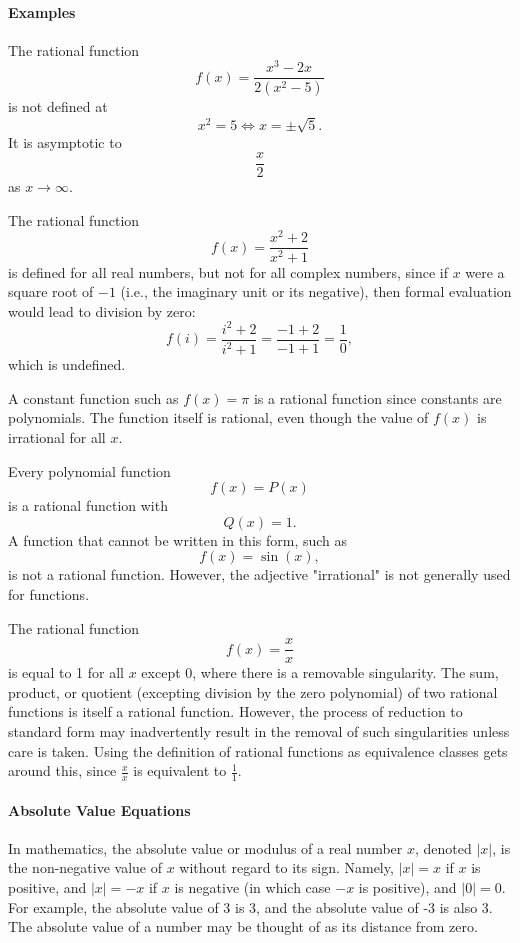 \paragraph{Examples}

The rational function
$$
f(x) = \frac{x^{3} - 2x}{2(x^{2} - 5)}
$$
is not defined at
$$
x^{2} = 5 \Leftrightarrow x = \pm \sqrt{5}.
$$
It is asymptotic to
$$
\frac{x}{2}
$$
as $x \to \infty$.

The rational function
$$
f(x) = \frac{x^{2} + 2}{x^{2} + 1}
$$
is defined for all real numbers, but not for all complex numbers, since if $x$ were a square root of $-1$ (i.e., the imaginary unit or its negative), then formal evaluation would lead to division by zero:
$$
f(i) = \frac{i^{2} + 2}{i^{2} + 1} = \frac{-1 + 2}{-1 + 1} = \frac{1}{0},
$$
which is undefined.

A constant function such as $f(x) = \pi$ is a rational function since constants are polynomials. The function itself is rational, even though the value of $f(x)$ is irrational for all $x$.

Every polynomial function
$$
f(x) = P(x)
$$
is a rational function with
$$
Q(x) = 1.
$$
A function that cannot be written in this form, such as
$$
f(x) = \sin(x),
$$
is not a rational function. However, the adjective "irrational" is not generally used for functions.

The rational function
$$
f(x) = \frac{x}{x}
$$
is equal to 1 for all $x$ except 0, where there is a removable singularity. The sum, product, or quotient (excepting division by the zero polynomial) of two rational functions is itself a rational function. However, the process of reduction to standard form may inadvertently result in the removal of such singularities unless care is taken. Using the definition of rational functions as equivalence classes gets around this, since $\frac{x}{x}$ is equivalent to $\frac{1}{1}$.

\paragraph{Absolute Value Equations}

In mathematics, the absolute value or modulus of a real number $x$, denoted $|x|$, is the non-negative value of $x$ without regard to its sign. Namely, $|x| = x$ if $x$ is positive, and $|x| = -x$ if $x$ is negative (in which case $-x$ is positive), and $|0| = 0$. For example, the absolute value of 3 is 3, and the absolute value of -3 is also 3. The absolute value of a number may be thought of as its distance from zero.

